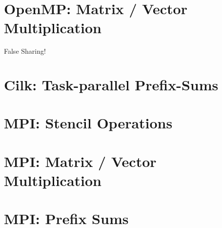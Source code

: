 \documentclass[11pt]{article}
\begin{document}
\section{OpenMP: Matrix / Vector Multiplication}
False Sharing!


\section{Cilk: Task-parallel Prefix-Sums}

\section{MPI: Stencil Operations}

\section{MPI: Matrix / Vector Multiplication}

\section{MPI: Prefix Sums}
\end{document}

